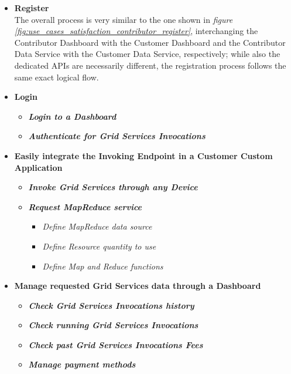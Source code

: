 \begin{itemize}
    \item \textbf{Register}\\
    The overall process is very similar to the one shown in \textit{figure \ref{fig:use_cases_satisfaction_contributor_register}}, interchanging the Contributor Dashboard with the Customer Dashboard and the Contributor Data Service with the Customer Data Service, respectively; while also the dedicated APIs are necessarily different, the registration process follows the same exact logical flow.

    \item \textbf{Login}\\
    \begin{itemize}
        \item \textbf{\textit{Login to a Dashboard}}\\
        \item \textbf{\textit{Authenticate for Grid Services Invocations}}\\
    \end{itemize}
    \item \textbf{Easily integrate the Invoking Endpoint in a Customer Custom Application}\\
    \begin{itemize}
        \item \textbf{\textit{Invoke Grid Services through any Device}}\\
        \item \textbf{\textit{Request MapReduce service}}\\
        \begin{itemize}
            \item \textit{Define MapReduce data source}\\
            \item \textit{Define Resource quantity to use}\\
            \item \textit{Define Map and Reduce functions}\\
        \end{itemize}
    \end{itemize}
    \item \textbf{Manage requested Grid Services data through a Dashboard}\\
    \begin{itemize}
        \item \textbf{\textit{Check Grid Services Invocations history}}\\
        \item \textbf{\textit{Check running Grid Services Invocations}}\\
        \item \textbf{\textit{Check past Grid Services Invocations Fees}}\\
        \item \textbf{\textit{Manage payment methods}}\\
    \end{itemize}
\end{itemize}